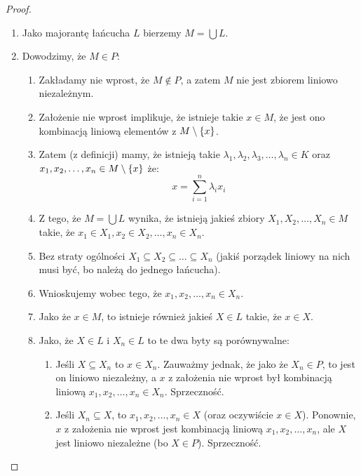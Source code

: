 \begin{proof}
    \begin{enumerate}
        \item Jako majorantę łańcucha \(L\) bierzemy \(M = \bigcup L\).
        \item Dowodzimy, że \(M \in P\):
        \begin{enumerate}
            \item Zakładamy nie wprost, że \(M \not \in P\), a zatem \(M\) nie jest zbiorem liniowo niezależnym. 
            \item Założenie nie wprost implikuje, że istnieje takie \(x \in M\), że jest ono kombinacją liniową  elementów z \(M \setminus \set{x}\). 
            \item Zatem (z definicji) mamy, że istnieją takie \( \lambda_1, \lambda_2, \lambda_3, \dots, \lambda_n \in K\) oraz \( x_1, x_2, \dots, x_n \in M \setminus \set{x}\) że:
            \[
                x = \sum_{i=1}^{n} \lambda_i x_i
            \]
            \item Z tego, że \(M = \bigcup L\) wynika, że istnieją jakieś zbiory \(X_1, X_2, \dots, X_n \in M\) takie, że \(x_1 \in X_1, x_2 \in X_2, \dots, x_n \in X_n\). 
            \item Bez straty ogólności \(X_1 \subseteq X_2 \subseteq \dots \subseteq X_n\) (jakiś porządek liniowy na nich musi być, bo należą do jednego łańcucha).
            \item Wnioskujemy wobec tego, że \(x_1, x_2, \dots, x_n \in X_n\). 
            \item Jako że \(x \in M\), to istnieje również jakieś \(X \in L\) takie, że \(x \in X\).
            \item Jako, że \(X \in L\) i \(X_n \in L\) to te dwa byty są porównywalne:
            \begin{enumerate}
                \item Jeśli \(X \subseteq X_n\) to \(x \in X_n\). Zauważmy jednak, że jako że \(X_n \in P\), to jest on liniowo niezależny, a \(x\) z założenia nie wprost był kombinacją liniową \(x_1, x_2, \dots, x_n \in X_n\). Sprzeczność.
                \item Jeśli \(X_n \subseteq X\), to \(x_1, x_2, \dots, x_n \in X\) (oraz oczywiście \(x \in X\)). Ponownie, \(x\) z założenia nie wprost jest kombinacją liniową \(x_1, x_2, \dots, x_n\), ale \(X\) jest liniowo niezależne (bo \(X \in P\)). Sprzeczność. 
            \end{enumerate}
        \end{enumerate}
    \end{enumerate}
    

\end{proof}
